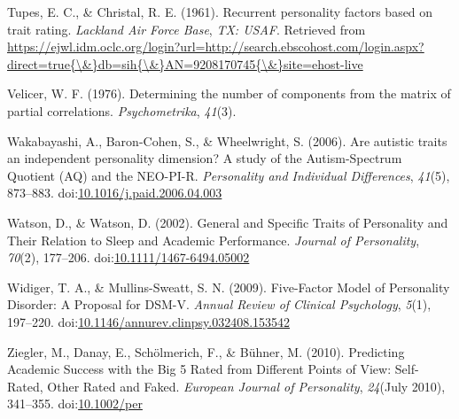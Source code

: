 \documentclass[,man,floatsintext]{apa6}
\begin{document}
\hypertarget{ref-TupesChristal1961}{}
Tupes, E. C., \& Christal, R. E. (1961). Recurrent personality factors
based on trait rating. \emph{Lackland Air Force Base}, \emph{TX: USAF}.
Retrieved from
\href{https://ejwl.idm.oclc.org/login?url=http://search.ebscohost.com/login.aspx?direct=true\%7B/\&\%7Ddb=sih\%7B/\&\%7DAN=9208170745\%7B/\&\%7Dsite=ehost-live}{https://ejwl.idm.oclc.org/login?url=http://search.ebscohost.com/login.aspx?direct=true\{\textbackslash{}\&\}db=sih\{\textbackslash{}\&\}AN=9208170745\{\textbackslash{}\&\}site=ehost-live}

\hypertarget{ref-Velicer1976}{}
Velicer, W. F. (1976). Determining the number of components from the
matrix of partial correlations. \emph{Psychometrika}, \emph{41}(3).

\hypertarget{ref-Wakabayashi2006}{}
Wakabayashi, A., Baron-Cohen, S., \& Wheelwright, S. (2006). Are
autistic traits an independent personality dimension? A study of the
Autism-Spectrum Quotient (AQ) and the NEO-PI-R. \emph{Personality and
Individual Differences}, \emph{41}(5), 873--883.
doi:\href{https://doi.org/10.1016/j.paid.2006.04.003}{10.1016/j.paid.2006.04.003}

\hypertarget{ref-Watson2002}{}
Watson, D., \& Watson, D. (2002). General and Specific Traits of
Personality and Their Relation to Sleep and Academic Performance.
\emph{Journal of Personality}, \emph{70}(2), 177--206.
doi:\href{https://doi.org/10.1111/1467-6494.05002}{10.1111/1467-6494.05002}

\hypertarget{ref-WidigerMullins2009}{}
Widiger, T. A., \& Mullins-Sweatt, S. N. (2009). Five-Factor Model of
Personality Disorder: A Proposal for DSM-V. \emph{Annual Review of
Clinical Psychology}, \emph{5}(1), 197--220.
doi:\href{https://doi.org/10.1146/annurev.clinpsy.032408.153542}{10.1146/annurev.clinpsy.032408.153542}

\hypertarget{ref-Ziegler2010}{}
Ziegler, M., Danay, E., Schölmerich, F., \& Bühner, M. (2010).
Predicting Academic Success with the Big 5 Rated from Different Points
of View: Self-Rated, Other Rated and Faked. \emph{European Journal of
Personality}, \emph{24}(July 2010), 341--355.
doi:\href{https://doi.org/10.1002/per}{10.1002/per}

\endgroup

\clearpage

\renewcommand{\listtablename}{Table captions}

\listoftables
\end{document}
